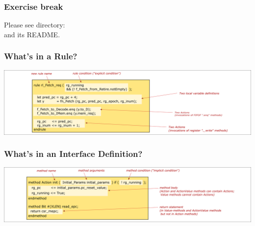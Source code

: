 
\begin{frame}
\frametitle{\EmojiExercise \hmm Exercise break}

Please see directory:  \\
and its README.

\end{frame}


\begin{frame}
\frametitle{What's in a Rule?}

\begin{center}
\includegraphics[width=\textwidth]{../Figures/Fig_BSV_whats_in_a_rule}
\end{center}

\end{frame}


\begin{frame}
\frametitle{What's in an Interface Definition?}

\begin{center}
\includegraphics[width=\textwidth]{../Figures/Fig_BSV_whats_in_an_interface_def}
\end{center}

\end{frame}


